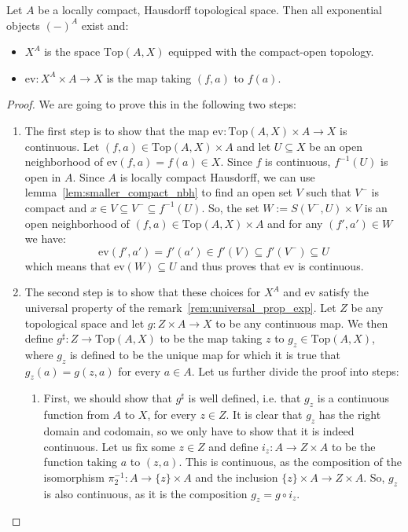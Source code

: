 \begin{theorem}\label{thm:top_exponential} Let $A$ be a locally compact, Hausdorff topological space. Then all exponential objects $(-)^A$ exist and:
\begin{itemize}
\item $X^A$ is the space $\mathrm{Top}(A,X)$ equipped with the compact-open topology.
\item $\mathrm{ev}:X^A\times A\to X$ is the map taking $(f,a)$ to $f(a)$.
\end{itemize}
\end{theorem}
\begin{proof} We are going to prove this in the following two steps:
\begin{enumerate}
\item The first step is to show that the map $\mathrm{ev}:\mathrm{Top}(A,X)\times A\to X$ is continuous. Let $(f,a)\in\mathrm{Top}(A,X)\times A$ and let $U\subseteq X$ be an open neighborhood of $\mathrm{ev}(f,a)=f(a)\in X$. Since $f$ is continuous, $f^{-1}(U)$ is open in $A$. Since $A$ is locally compact Hausdorff, we can use lemma~\ref{lem:smaller_compact_nbh} to find an open set $V$ such that $V^-$ is compact and $x\in V\subseteq V^-\subseteq f^{-1}(U)$. So, the set $W:=S(V^-,U)\times V$ is an open neighborhood of $(f,a)\in\mathrm{Top}(A,X)\times A$ and for any $(f',a')\in W$ we have:
\[\mathrm{ev}(f',a')=f'(a')\in f'(V)\subseteq f'(V^-)\subseteq U\]
which means that $\mathrm{ev}(W)\subseteq U$ and thus proves that $\mathrm{ev}$ is continuous.
\item The second step is to show that these choices for $X^A$ and $\mathrm{ev}$ satisfy the universal property of the remark~\ref{rem:universal_prop_exp}. Let $Z$ be any topological space and let $g:Z\times A\to X$ to be any continuous map. We then define $g^{\sharp}:Z\to\mathrm{Top}(A,X)$ to be the map taking $z$ to $g_z\in\mathrm{Top}(A,X)$, where $g_z$ is defined to be the unique map for which it is true that $g_z(a)=g(z,a)$ for every $a\in A$. Let us further divide the proof into steps:
\begin{enumerate}
\item First, we should show that $g^{\sharp}$ is well defined, i.e. that $g_z$ is a continuous function from $A$ to $X$, for every $z\in Z$. It is clear that $g_z$ has the right domain and codomain, so we only have to show that it is indeed continuous. Let us fix some $z\in Z$ and define $i_z:A\to Z\times A$ to be the function taking $a$ to $(z,a)$. This is continuous, as the composition of the isomorphism $\pi_2^{-1}:A\to\{z\}\times A$ and the inclusion $\{z\}\times A\to Z\times A$. So, $g_z$ is also continuous, as it is the composition $g_z=g\circ i_z$.

\end{enumerate}
\end{enumerate}
\end{proof}
